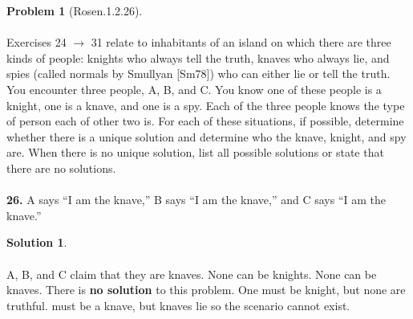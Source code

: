 \documentclass{article}
\theoremstyle{definition}
\newtheorem*{problem}{Problem}
\newtheorem*{solution}{Solution}
\begin{document}
\begin{problem}[Rosen.1.2.26]\ \\
\ \\
Exercises 24 $\rightarrow$ 31 relate to inhabitants of an island on which
there are three kinds of people: knights who always tell the
truth, knaves who always lie, and spies (called normals by
Smullyan [Sm78]) who can either lie or tell the truth. You
encounter three people, A, B, and C. You know one of these
people is a knight, one is a knave, and one is a spy. Each of the
three people knows the type of person each of other two is. For
each of these situations, if possible, determine whether there
is a unique solution and determine who the knave, knight, and
spy are. When there is no unique solution, list all possible
solutions or state that there are no solutions.\ \\
\ \\
\textbf{26.} A says “I am the knave,” B says “I am the knave,” and C
says “I am the knave.”
\begin{compactenum}
\renewcommand{\theenumi}{\alph{enumi}}

\end{compactenum}
\end{problem}

\begin{solution}\ \\
\ \\
\noindent A, B, and C claim that they are knaves. None can be knights. None can be knaves. There is \textbf{no solution} to this problem. One must be knight, but none are truthful. must be a knave, but knaves lie so the scenario cannot exist.





\begin{compactenum}
\renewcommand{\theenumi}{\alph{enumi}}


\end{compactenum}
\end{solution}
\end{document}
